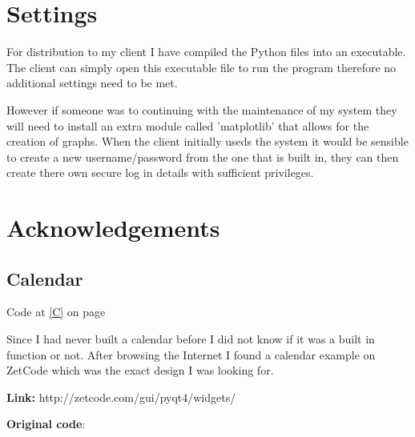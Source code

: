 \section{Settings}

For distribution to my client I have compiled the Python files into an executable. The client can simply open this executable file to run the program therefore no additional settings need to be met.

However if someone was to continuing with the maintenance of my system they will need to install an extra module called 'matplotlib' that allows for the creation of graphs. When the client initially useds the system it would be sensible to create a new username/password from the one that is built in, they can then create there own secure log in details with sufficient privileges.   

\section{Acknowledgements}

\subsection{Calendar}

Code at \ref{C} on page \pageref{C}

Since I had never built a calendar before I did not know if it was a built in function or not. After browsing the Internet I found a calendar example on ZetCode which was the exact design I was looking for. 

\textbf{Link:} http://zetcode.com/gui/pyqt4/widgets/

\textbf{Original code}:

